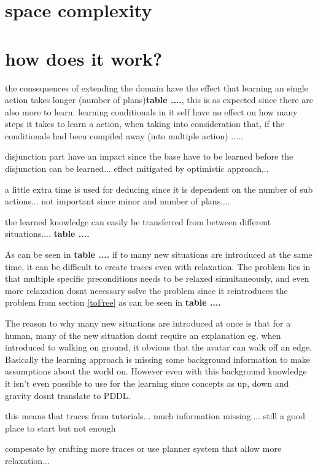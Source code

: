 \section{space complexity}

	
\section{how does it work?}	
	the consequences of extending the domain have the effect that learning an single action takes longer (number of plans)\textbf{table ....}, this is as expected since there are also more to learn. learning conditionals in it self have no effect on how many steps it takes to learn a action, when taking into consideration that, if the conditionals had been compiled away (into multiple action) .....
	
	disjunction part have an impact since the base have to be learned before the disjunction can be learned... effect mitigated by optimistic approach... 
	
	a little extra time is used for deducing since it is dependent on the number of sub actions... not important since minor and number of plans....
	
	
	the learned knowledge can easily be transferred from between different situations.... \textbf{table ....}
	
	As can be seen in \textbf{table ....} if to many new situations are introduced at the same time, it can be difficult to create traces even with relaxation. The problem lies in that multiple specific preconditions needs to be relaxed simultaneously, and even more relaxation dosnt necessary solve the problem since it reintroduces the problem from section \ref{toFree} as can be seen in \textbf{table ....}
	
	The reason to why many new situations are introduced at once is that for a human, many of the new situation dosnt require an explanation eg. when introduced to walking on ground, it obvious that the avatar can walk off an edge. Basically the learning approach is missing some background information to make assumptions about the world on. However even with this background knowledge it isn't even possible to use for the learning since concepts as up, down and gravity dosnt translate to PDDL. 
	 
	 this means that traces from tutorials... much information missing.... still a good place to start but not enough
	 
	 compesate by crafting more traces or use planner system that allow more relaxation...
	
	
